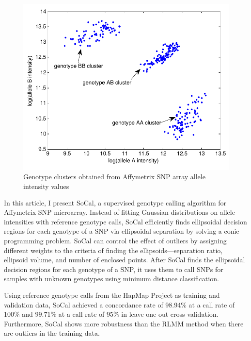 \documentclass{scrartcl}
\begin{document}
\begin{figure}[H]
\centering
\includegraphics[scale=0.75]{intro_figs/intro_genotype_clusters.pdf}
\caption{Genotype clusters obtained from Affymetrix SNP array
allele intensity values}
\label{fig:intro_genclus}
\end{figure}

\par
In this article, I present SoCal, a supervised genotype calling algorithm
for Affymetrix SNP microarray.
Instead of fitting Gaussian distributions on allele intensities with reference
genotype calls, SoCal efficiently finds ellipsoidal decision regions for each
genotype of a SNP via ellipsoidal separation by solving a conic programming
problem.
SoCal can control the effect of outliers by assigning different weights to 
the criteria of finding the ellipsoids---separation ratio, ellipsoid
volume, and number of enclosed points. 
After SoCal finds the ellipsoidal decision regions for each genotype of
a SNP, it uses them to call SNPs for samples with unknown genotypes using
minimum distance classification.

\par
Using reference genotype calls from the HapMap Project as training and
validation data, SoCal achieved a concordance rate of 98.94\% at a call rate
of 100\% and $99.71\%$ at a call rate of $95\%$ in leave-one-out
cross-validation.
Furthermore, SoCal shows more robustness than the RLMM method when there are
outliers in the training data.
\end{document}
